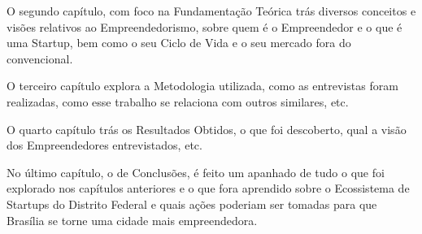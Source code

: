 O segundo capítulo, com foco na Fundamentação Teórica trás diversos conceitos e visões relativos ao Empreendedorismo, sobre quem é o Empreendedor e o que é uma Startup, bem como o seu Ciclo de Vida e o seu mercado fora do convencional. 

O terceiro capítulo explora a Metodologia utilizada, como as entrevistas foram realizadas, como esse trabalho se relaciona com outros similares, etc. 

O quarto capítulo trás os Resultados Obtidos, o que foi descoberto, qual a visão dos Empreendedores entrevistados, etc.

No último capítulo, o de Conclusões, é feito um apanhado de tudo o que foi explorado nos capítulos anteriores e o que fora aprendido sobre o Ecossistema de Startups do Distrito Federal e quais ações poderiam ser tomadas para que Brasília se torne uma cidade mais empreendedora.